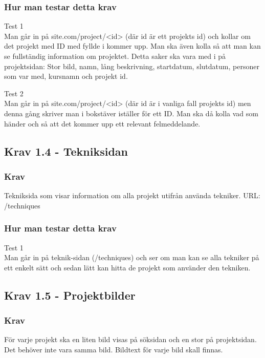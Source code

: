 \documentclass{TDP003mall}
\begin{document}
        \subsubsection{Hur man testar detta krav}
        
        Test 1\\
        Man går in på site.com/project/<id> (där id är ett projekts id) och kollar om det projekt med ID med fyllde i kommer upp. Man ska även kolla så att man kan se fullständig information om projektet. Detta saker ska vara med i på projektsidan: Stor bild, namn, lång beskrivning, startdatum, slutdatum, personer som var med, kursnamn och projekt id.
        
        Test 2\\
        Man går in på site.com/project/<id> (där id är i vanliga fall projekts id) men denna gång skriver man i bokstäver iställer för ett ID. Man ska då kolla vad som händer och så att det kommer upp ett relevant felmeddelande.
    
    \subsection{Krav 1.4 - Tekniksidan}
    
        \subsubsection{Krav}
        Tekniksida som visar information om alla projekt utifrån använda tekniker.
        URL: /techniques
    
        \subsubsection{Hur man testar detta krav}
        
        Test 1\\
        Man går in på teknik-sidan (/techniques) och ser om man kan se alla tekniker på ett enkelt sätt och sedan lätt kan hitta de projekt som använder den tekniken.
    
    \subsection{Krav 1.5 - Projektbilder}
    
        \subsubsection{Krav}
        För varje projekt ska en liten bild visas på söksidan och en stor på
        projektsidan. Det behöver inte vara samma bild. Bildtext för varje bild
        skall finnas.
    
\end{document}

